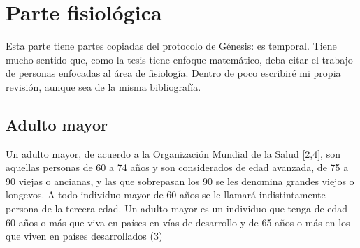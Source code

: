 \chapter{Parte fisiol\'ogica}

Esta parte tiene partes copiadas del protocolo de G\'enesis: es temporal. Tiene mucho sentido
que, como la tesis tiene enfoque matem\'atico, deba citar el trabajo de personas enfocadas al
\'area de fisiolog\'ia. Dentro de poco escribir\'e mi propia revisi\'on, aunque sea de la misma
bibliograf\'ia.

\section{Adulto mayor}

Un adulto mayor, de acuerdo a la Organización Mundial de la Salud [2,4], son aquellas personas de 60 a 74 años y son considerados de edad avanzada, de 75 a 90 viejas o ancianas, y las que sobrepasan los 90 se les denomina grandes viejos o longevos. A todo individuo mayor de 60 años se le llamará indistintamente persona de la tercera edad. Un adulto mayor es un individuo que tenga de edad 60 años o más que viva en países en vías de desarrollo y de 65 años o más en los que viven en países desarrollados (3) 

